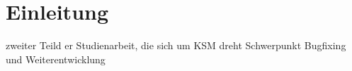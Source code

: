 \section{Einleitung}

zweiter Teild er Studienarbeit, die sich um KSM dreht
Schwerpunkt Bugfixing und Weiterentwicklung
